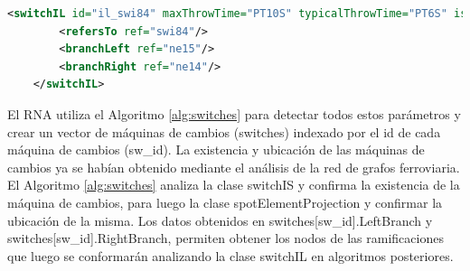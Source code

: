     \begin{lstlisting}[language = XML, caption = Clase switchIL , label = {lst:switchIL}]
    <switchIL id="il_swi84" maxThrowTime="PT10S" typicalThrowTime="PT6S" isKeyLocked="false" returnsToPreferredPosition="false">
        <refersTo ref="swi84"/>
        <branchLeft ref="ne15"/>
        <branchRight ref="ne14"/>
    </switchIL>
    \end{lstlisting}
    
    El RNA utiliza el Algoritmo \ref{alg:switches} para detectar todos estos parámetros y crear un vector de máquinas de cambios (switches) indexado por el id de cada máquina de cambios (sw\_id). La existencia y ubicación de las máquinas de cambios ya se habían obtenido mediante el análisis de la red de grafos ferroviaria. El Algoritmo \ref{alg:switches} analiza la clase switchIS y confirma la existencia de la máquina de cambios, para luego la clase spotElementProjection y confirmar la ubicación de la misma. Los datos obtenidos en switches[sw\_id].LeftBranch y switches[sw\_id].RightBranch, permiten obtener los nodos de las ramificaciones que luego se conformarán analizando la clase switchIL en algoritmos posteriores.

